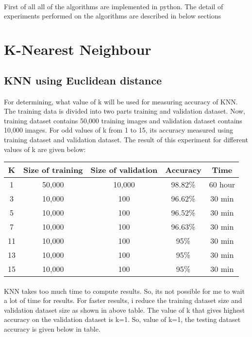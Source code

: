 \documentclass[]{report}
\begin{document}
\paragraph{}First of all all of the algorithms are implemented in python. The detail of experiments performed on the algorithms are described in below sections
\section{K-Nearest Neighbour}
\subsection{KNN using Euclidean distance}
\paragraph{}For determining, what value of k will be used for measuring accuracy of KNN. The training data is divided into two parts training and validation dataset. Now, training dataset contains 50,000 training images and validation dataset contains 10,000 images. For odd values of k from 1 to 15, its accuracy measured using training dataset and validation dataset. The result of this experiment for different values of k are given below:

\begin{center}
	\begin{tabular}{||c c c c c||} 
		\hline
		K & Size of training & Size of validation & Accuracy& Time \\ [0.5ex] 
		\hline\hline
		1 & 50,000 & 10,000 & 98.82\% & 60 hour \\ 
		\hline
		3 & 10,000 & 100&96.62\% & 30 min \\ 
		\hline
		5 & 10,000 & 100 & 96.52\% &30 min \\
		\hline
		7 & 10,000 & 100 & 96.63\% & 30 min \\
		\hline
		11 & 10,000 & 100 & 95\% & 30 min \\
		\hline
		13 & 10,000 & 100 & 95\% & 30 min \\
		\hline
		15 & 10,000 & 100 & 95\% & 30 min \\ [1ex] 
		\hline
	\end{tabular}
\end{center}
\paragraph{} KNN takes too much time to compute results. So, its not possible for me to wait a lot of time for results. For faster results, i reduce the training dataset size and validation dataset size as shown in above table. The value of k that gives highest accuracy on the validation dataset is k=1. So, value of k=1, the testing dataset accuracy is given below in table.
\end{document}
